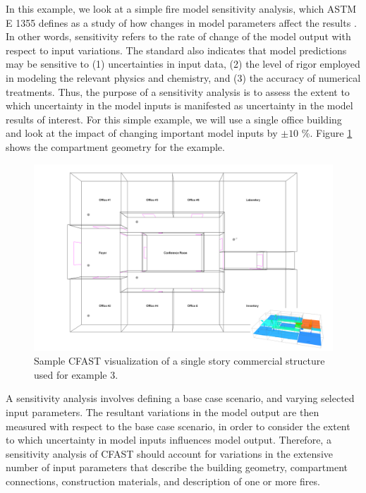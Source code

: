 \documentclass[12pt,twoside]{book}
\begin{document}
In this example, we look at a simple fire model sensitivity analysis, which ASTM E 1355 defines as a study of how changes in model parameters affect the results \cite{CFAST:ASTM:E1355}. In other words, sensitivity refers to the rate of change of the model output with respect to input variations. The standard also indicates that model predictions may be sensitive to (1) uncertainties in input data, (2) the level of rigor employed in modeling the relevant physics and chemistry, and (3) the accuracy of numerical treatments. Thus, the purpose of a sensitivity analysis is to assess the extent to which uncertainty in the model inputs is manifested as uncertainty in the model results of interest. For this simple example, we will use a single office building and look at the impact of changing important model inputs by $\pm 10$ \%. Figure \ref{sensitivity_geometry} shows the compartment geometry for the example.

\begin{figure}[h!]
\centering
\includegraphics[width=6.5in]{FIGURES/Sensitivity.png}
\caption{Sample CFAST visualization of a single story commercial structure used for example 3.}
\label{sensitivity_geometry}
\end{figure}

A sensitivity analysis involves defining a base case scenario, and varying selected input parameters. The resultant variations in the model output are then measured with respect to the base case scenario, in order to consider the extent to which uncertainty in model inputs influences model output. Therefore, a sensitivity analysis of CFAST should account for variations in the extensive number of input parameters that describe the building geometry, compartment connections, construction materials, and description of one or more fires.
\end{document}
